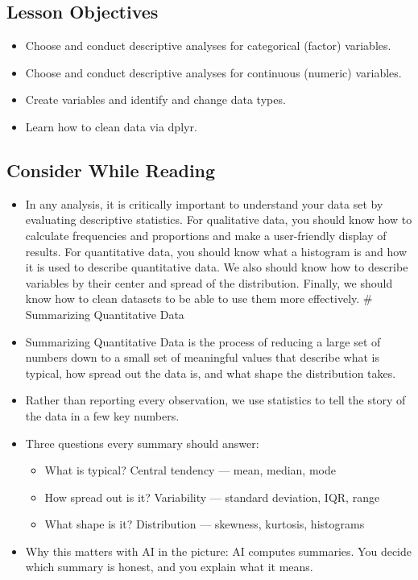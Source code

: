 \documentclass[
  letterpaper,
  DIV=11,
  numbers=noendperiod]{scrreprt}
\providecommand{\tightlist}{%
  \setlength{\itemsep}{0pt}\setlength{\parskip}{0pt}}\usepackage{longtable,booktabs,array}
\begin{document}
\subsection{Lesson Objectives}\label{lesson-objectives-1}

\begin{itemize}
\tightlist
\item
  Choose and conduct descriptive analyses for categorical (factor)
  variables.
\item
  Choose and conduct descriptive analyses for continuous (numeric)
  variables.
\item
  Create variables and identify and change data types.
\item
  Learn how to clean data via dplyr.
\end{itemize}

\subsection{Consider While Reading}\label{consider-while-reading-1}

\begin{itemize}
\item
  In any analysis, it is critically important to understand your data
  set by evaluating descriptive statistics. For qualitative data, you
  should know how to calculate frequencies and proportions and make a
  user-friendly display of results. For quantitative data, you should
  know what a histogram is and how it is used to describe quantitative
  data. We also should know how to describe variables by their center
  and spread of the distribution. Finally, we should know how to clean
  datasets to be able to use them more effectively. \# Summarizing
  Quantitative Data
\item
  Summarizing Quantitative Data is the process of reducing a large set
  of numbers down to a small set of meaningful values that describe what
  is typical, how spread out the data is, and what shape the
  distribution takes.
\item
  Rather than reporting every observation, we use statistics to tell the
  story of the data in a few key numbers.
\item
  Three questions every summary should answer:

  \begin{itemize}
  \tightlist
  \item
    What is typical? Central tendency --- mean, median, mode
  \item
    How spread out is it? Variability --- standard deviation, IQR, range
  \item
    What shape is it? Distribution --- skewness, kurtosis, histograms
  \end{itemize}
\item
  Why this matters with AI in the picture: AI computes summaries. You
  decide which summary is honest, and you explain what it means.
\end{itemize}
\end{document}
